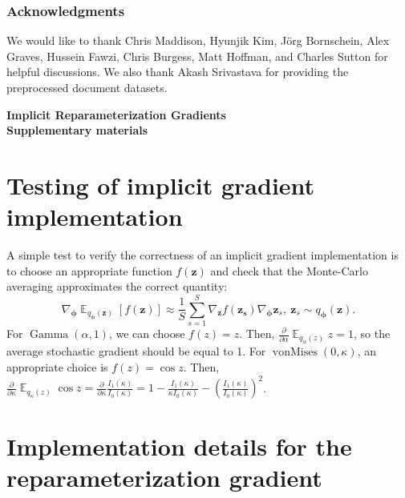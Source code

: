 \documentclass{article}
\DeclareMathOperator{\E}{\mathbb{E}}
\let\vec\bm
\begin{document}
\subsubsection*{Acknowledgments}
We would like to thank Chris Maddison, Hyunjik Kim, J\"org Bornschein, Alex Graves, Hussein Fawzi, Chris Burgess, Matt Hoffman, and Charles Sutton for helpful discussions.
We also thank Akash Srivastava for providing the preprocessed document datasets.

\printbibliography

\newpage
\appendix

\begin{refsection}
\newpage
\appendix

\begin{center}
    \textbf{\Large Implicit Reparameterization Gradients \\ Supplementary materials}
\end{center}

\section{Testing of implicit gradient implementation}
A simple test to verify the correctness of an implicit gradient implementation is to choose an appropriate function $f(\vec{z})$ and check that the Monte-Carlo averaging approximates the correct quantity:
\begin{equation}
    \nabla_{\vec{\phi}} \E_{q_{\vec{\phi}} (\vec{z})} \left[f(\vec{z})\right] \approx \frac{1}{S} \sum_{s=1}^S \nabla_{\vec{z}}  f(\vec{z_s}) \nabla_{\vec{\phi}} \vec{z}_s,\ \vec{z}_s \sim q_{\vec{\phi}}(\vec{z}).
\end{equation}
For $\operatorname{Gamma}(\alpha, 1)$, we can choose $f(z) = z$.
Then, $\frac{\partial}{\partial \alpha} \E_{q_{\alpha}(z)} z = 1$, so the average stochastic gradient should be equal to 1.
For $\operatorname{vonMises}(0, \kappa)$, an appropriate choice is $f(z) = \cos z$.
Then, $\frac{\partial }{\partial \kappa} \E_{q_{\kappa}(z)} \cos z = \frac{\partial}{\partial \kappa} \frac{I_1(\kappa)}{I_0(\kappa)} = 1 - \frac{I_1(\kappa)}{\kappa I_0(\kappa)} - \left( \frac{I_1(\kappa)}{I_0(\kappa)} \right)^2$.

\section{Implementation details for the reparameterization gradient}
\label{sec:reparameterization-gradient-implementation}


\end{refsection}
\end{document}
